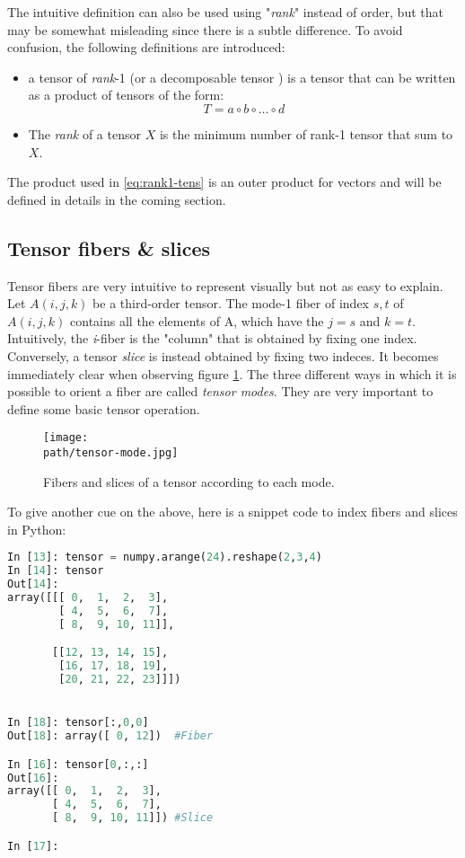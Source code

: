 The intuitive definition can also be used using "\emph{rank}" instead of order, but that may be somewhat misleading since there is a subtle difference. To avoid confusion, the following definitions are introduced: 
\begin{itemize}
  \item a tensor of \emph{rank}-1 (or a decomposable tensor \parencite{tensor-hackbusch2012}) is a tensor that can be written as a product of tensors of the form: 
  \begin{equation}
  \label{eq:rank1-tens}
    T = a \circ b \circ \ldots \circ d  
  \end{equation}   
  
  \item The \emph{rank} of a tensor $X$ is the minimum number of rank-1 tensor that sum to $X$.

\end{itemize}

The product used in \ref{eq:rank1-tens} is an outer product for vectors and will be defined in details in the coming section. 

\subsection{Tensor fibers \& slices}
Tensor fibers are very intuitive to represent visually but not as easy to explain. \\
Let $A(i,j,k)$ be a third-order tensor. The mode-1 fiber of index $s,t$  of $A(i,j,k)$ contains all the elements of A, which have the $j=s$ and $k=t$. 
\\
Intuitively, the \emph{i}-fiber is the "column" that is obtained by fixing one index. Conversely, a tensor \emph{slice} is instead obtained by fixing two indeces. It becomes immediately clear when observing figure \ref{fig:tensor-fibers}. The three different ways in which it is possible to orient a fiber are called \emph{tensor modes}. They are very important to define some basic tensor operation. 

\begin{figure}[h!]
 \centering
 \texttt{[image: \\path/tensor-mode.jpg]} 
 \caption{Fibers and slices of a tensor according to each mode.}
 \label{fig:tensor-fibers}
\end{figure}

\pagebreak
To give another cue on the above, here is a snippet code to index fibers and slices in Python: 
\begin{lstlisting}[language={Python}]
In [13]: tensor = numpy.arange(24).reshape(2,3,4) 
In [14]: tensor
Out[14]: 
array([[[ 0,  1,  2,  3],
        [ 4,  5,  6,  7],
        [ 8,  9, 10, 11]],

       [[12, 13, 14, 15],
        [16, 17, 18, 19],
        [20, 21, 22, 23]]])


In [18]: tensor[:,0,0]
Out[18]: array([ 0, 12])  #Fiber

In [16]: tensor[0,:,:]
Out[16]: 
array([[ 0,  1,  2,  3],
       [ 4,  5,  6,  7],
       [ 8,  9, 10, 11]]) #Slice 

In [17]: 

\end{lstlisting}


